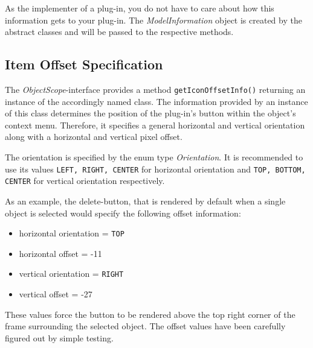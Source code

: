 As the implementer of a plug-in, you do not have to care about how this
information gets to your plug-in. The 
\textit{ModelInformation} object is created by the abstract classes and will be
passed to the respective methods.

\subsection{Item Offset Specification}
The \textit{ObjectScope}-interface provides a method \verb!getIconOffsetInfo()! returning an instance of the accordingly named class.
The information provided by an instance of this class determines the position of the plug-in's button within the object's context menu. Therefore, it specifies a general horizontal and vertical orientation along with a horizontal and vertical pixel offset.

The orientation is specified by the enum type \textit{Orientation}. It is recommended to use its values \verb!LEFT, RIGHT, CENTER! for horizontal orientation and \verb!TOP, BOTTOM, CENTER! for vertical orientation respectively.

As an example, the delete-button, that is rendered by default when a single object is selected would specify the following offset information:
\begin{itemize}
 \item horizontal orientation = \verb!TOP!
 \item horizontal offset = -11
 \item vertical orientation = \verb!RIGHT!
 \item vertical offset = -27
\end{itemize}
These values force the button to be rendered above the top right corner of the frame surrounding the selected object. The offset values have been carefully figured out by simple testing.

